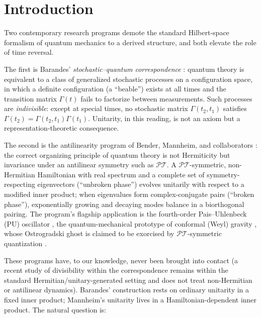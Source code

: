 \documentclass[11pt]{article}
\theoremstyle{definition}
\theoremstyle{remark}
\newcommand{\PT}{\mathcal{PT}}
\newcommand{\Gam}{\Gamma}
\begin{document}
\newpage
\tableofcontents
\newpage

\section{Introduction}
\label{sec:intro}

Two contemporary research programs demote the standard Hilbert-space
formalism of quantum mechanics to a derived structure, and both elevate the
role of time reversal.

The first is Barandes' \emph{stochastic--quantum correspondence}
\cite{Barandes2023,Barandes2025}: quantum theory is equivalent to a class of
generalized stochastic processes on a configuration space, in which a
definite configuration (a ``beable'') exists at all times and the transition
matrix $\Gam(t)$ fails to factorize between measurements. Such processes are
\emph{indivisible}: except at special times, no stochastic matrix
$\Gam(t_2,t_1)$ satisfies $\Gam(t_2)=\Gam(t_2,t_1)\Gam(t_1)$. Unitarity, in
this reading, is not an axiom but a representation-theoretic consequence.

The second is the antilinearity program of Bender, Mannheim, and
collaborators \cite{BenderBoettcher1998,Bender2007,Mannheim2018}: the
correct organizing principle of quantum theory is not Hermiticity but
invariance under an antilinear symmetry such as $\PT$. A $\PT$-symmetric,
non-Hermitian Hamiltonian with real spectrum and a complete set of
symmetry-respecting eigenvectors (``unbroken phase'') evolves
unitarily with respect to a modified inner product; when eigenvalues form
complex-conjugate pairs (``broken phase''), exponentially growing and
decaying modes balance in a biorthogonal pairing. The program's flagship
application is the fourth-order Pais--Uhlenbeck (PU) oscillator
\cite{PaisUhlenbeck1950}, the quantum-mechanical prototype of conformal
(Weyl) gravity \cite{Mannheim2012}, whose Ostrogradski ghost is claimed to
be exorcised by $\PT$-symmetric quantization \cite{BenderMannheim2008}.

These programs have, to our knowledge, never been brought into contact
(a recent study of divisibility within the correspondence
\cite{DivisibleIndivisible2025} remains within the standard
Hermitian/unitary-generated setting and does not treat non-Hermitian
or antilinear dynamics).
Barandes' construction rests on ordinary unitarity in a fixed inner product;
Mannheim's unitarity lives in a Hamiltonian-dependent inner product. The
natural question is:
\end{document}
